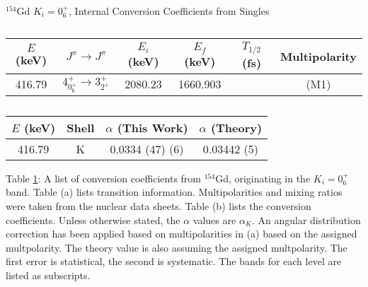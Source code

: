 \begin{table}
    \centering
    \caption{$^{154}$Gd $K_i=0^+_6$, Internal Conversion Coefficients from Singles}
    \label{tab:154Gd_Single_06_Disc}
\begin{ThreePartTable}
    \begin{subtable}{\textwidth}
        \caption{}
    \begin{tabular}{c|c|c|c|c|c}
        \toprule
        $E$ (keV)	&	$J^{\pi}	\rightarrow	J^{\pi}$	&	$E_i$ (keV)	&	$E_f$ (keV)	&	$T_{1/2}$ (fs)	&	Multipolarity	\\
        \hline
        416.79	&	$4^+_{0^+_6}	\rightarrow	3^+_{2^+}$	&	2080.23	&	1660.903	&		&	(M1)	\\
        \bottomrule
    \end{tabular}
    \end{subtable}
    \end{ThreePartTable}
\end{table}
\begin{table}
    \ContinuedFloat
    \begin{subtable}{\textwidth}
    \end{subtable}
    \begin{ThreePartTable}
    \begin{subtable}{\textwidth}
        \caption{}
        \begin{tabular}{c|c|c|c}
            \toprule
            $E$ (keV) & Shell &	$\alpha$ (This Work)	&	$\alpha$  (Theory)\citep{kibedi08:_BRICC}\\
            \hline
            416.79	 & K &	0.0334	(47) (6)	&	0.03442 (5)	\\
            \bottomrule
        \end{tabular}
        \end{subtable}

        \makeatletter\def\TPT@hsize{}\makeatletter

        \begin{tablenotes}[para]
            Table \ref{tab:154Gd_Single_06_Disc}: A list of conversion coefficients from $^{154}$Gd, originating in the $K_i=0^+_6$ band. Table (a) lists transition information. Multipolarities and mixing ratios were taken from the nuclear data sheets\citep{reich09:_nds_154}. Table (b) lists the conversion coefficients. Unless otherwise stated, the $\alpha$ values are $\alpha_K$. An angular distribution correction has been applied based on multipolarities in (a) based on the assigned multpolarity. The theory value is also assuming the assigned multpolarity. The first error is statistical, the second is systematic. The bands for each level are listed as subscripts.
        \end{tablenotes}
\end{ThreePartTable}
\end{table}
